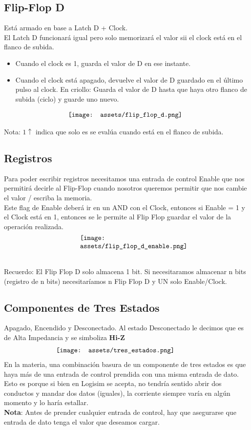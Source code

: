 \documentclass[10pt,a4paper]{article}
\begin{document}
\subsection*{Flip-Flop D}
Está armado en base a Latch D + Clock. \\
El Latch D funcionará igual pero solo memorizará el valor sii el clock está en el flanco de subida.
\begin{itemize}
    \item Cuando el clock es 1, guarda el valor de D en ese instante.
    \item Cuando el clock está apagado, devuelve el valor de D guardado en el último pulso al clock. En criollo: Guarda el valor de D hasta que haya otro flanco de subida (ciclo) y guarde uno nuevo.
\end{itemize}

\[\begin{minipage}[b]{0.5\textwidth}
    \texttt{[image: assets/flip\_flop\_d.png]}
    \label{fig:flip_flop_d}
\end{minipage}\]

Nota: \(1\uparrow\) indica que solo es se evalúa cuando está en el flanco de subida.
\subsection*{Registros}
Para poder escribir registros necesitamos una entrada de control Enable que nos permitirá decirle al Flip-Flop cuando nosotros queremos permitir que nos cambie el valor / escriba la memoria. \\
Este flag de Enable deberá ir en un AND con el Clock, entonces si Enable = 1 y el Clock está en 1, entonces se le permite al Flip Flop guardar el valor de la operación realizada.
\[\begin{minipage}[b]{0.4\textwidth}
    \texttt{[image: assets/flip\_flop\_d\_enable.png]}
    \label{fig:flip_flop_d_enable}
\end{minipage}\]

Recuerdo: El Flip Flop D solo almacena 1 bit. Si necesitaramos almacenar n bits (registro de n bits) necesitaríamos n Flip Flop D y UN solo Enable/Clock.

\subsection*{Componentes de Tres Estados}
Apagado, Encendido y Desconectado.
Al estado Desconectado le decimos que es de Alta Impedancia y se simboliza \textbf{Hi-Z}
\[\begin{minipage}[b]{0.6\textwidth}
    \texttt{[image: assets/tres\_estados.png]}
    \label{fig:tres_estados}
\end{minipage}\]
En la materia, una combinación basura de un componente de tres estados es que haya más de una entrada de control prendida con una misma entrada de dato. Esto es porque si bien en Logisim se acepta, no tendría sentido abrir dos conductos y mandar dos datos (iguales), la corriente siempre varía en algún momento y lo haría estallar. \\
\textbf{Nota}: Antes de prender cualquier entrada de control, hay que asegurarse que entrada de dato tenga el valor que deseamos cargar. 
\end{document}
